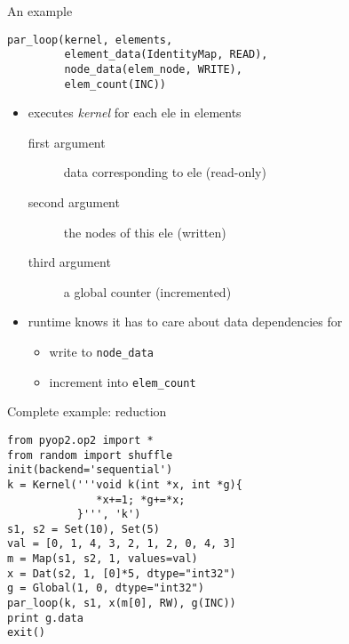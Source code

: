 \documentclass[bigger]{beamer}
\begin{document}
\begin{frame}[fragile,label={sec:orgheadline10}]{An example}
 \begin{verbatim}
par_loop(kernel, elements,
         element_data(IdentityMap, READ),
         node_data(elem_node, WRITE),
         elem_count(INC))
\end{verbatim}

\begin{itemize}
\item executes \emph{kernel} for each ele in elements
\begin{description}
\item[{first argument}] data corresponding to ele (read-only)
\item[{second argument}] the nodes of this ele (written)
\item[{third argument}] a global counter (incremented)
\end{description}

\item runtime knows it has to care about data dependencies for
\begin{itemize}
\item write to \verb~node_data~
\item increment into \verb~elem_count~
\end{itemize}
\end{itemize}
\end{frame}

\begin{frame}[fragile,label={sec:orgheadline11}]{Complete example: reduction}
 \begin{verbatim}
from pyop2.op2 import *
from random import shuffle
init(backend='sequential')
k = Kernel('''void k(int *x, int *g){
              *x+=1; *g+=*x;
           }''', 'k')
s1, s2 = Set(10), Set(5)
val = [0, 1, 4, 3, 2, 1, 2, 0, 4, 3]
m = Map(s1, s2, 1, values=val)
x = Dat(s2, 1, [0]*5, dtype="int32")
g = Global(1, 0, dtype="int32")
par_loop(k, s1, x(m[0], RW), g(INC))
print g.data
exit()
\end{verbatim}
\end{frame}
\end{document}

